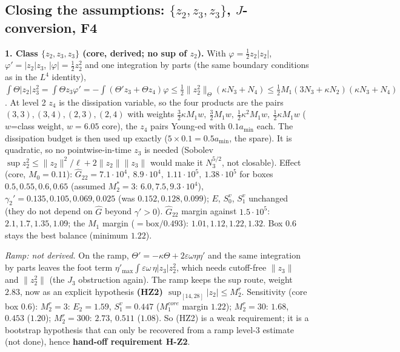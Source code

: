 \documentclass[11pt]{article}
\begin{document}
\subsection*{Closing the assumptions: $\{z_2,z_3,z_3\}$, $J$-conversion, F4}
\textbf{1. Class $\{z_2,z_3,z_3\}$ (core, derived; no sup of $z_2$).} With $\varphi=\tfrac12z_2|z_2|$, $\varphi'=|z_2|z_3$, $|\varphi|=\tfrac12z_2^2$ and one integration by parts (the same boundary conditions as in the $L^4$ identity),
$\int\Theta|z_2|z_3^2=\int\Theta z_3\varphi'=-\int(\Theta'z_3+\Theta z_4)\varphi\le\tfrac12\|z_2^2\|_\Theta(\kappa N_3+N_4)\le\tfrac12M_1(3N_3+\kappa N_2)(\kappa N_3+N_4)$.
At level 2 $z_4$ is the dissipation variable, so the four products are the pairs $(3,3),(3,4),(2,3),(2,4)$ with weights $\tfrac32\kappa M_1w,\ \tfrac32M_1w,\ \tfrac12\kappa^2M_1w,\ \tfrac12\kappa M_1w$ ($w$=class weight, $w=6.05$ core), the $z_4$ pairs Young-ed with $0.1a_{\min}$ each. The dissipation budget is then used up exactly ($5\times0.1=0.5a_{\min}$, the spare). It is quadratic, so no pointwise-in-time $z_3$ is needed (Sobolev $\sup z_2^2\le\|z_2\|^2/\ell+2\|z_2\|\|z_3\|$ would make it $N_3^{5/2}$, not closable). Effect (core, $M_0=0.11$): $\hat G_{22}=7.1\cdot10^4,\ 8.9\cdot10^4,\ 1.11\cdot10^5,\ 1.38\cdot10^5$ for boxes $0.5,0.55,0.6,0.65$ (assumed $M_2^*=3$: $6.0,7.5,9.3\cdot10^4$), $\gamma_2'=0.135,0.105,0.069,0.025$ (was $0.152,0.128,0.099$); $E$, $S_0^v$, $S_1^v$ unchanged (they do not depend on $\hat G$ beyond $\gamma'>0$). $\hat G_{22}$ margin against $1.5\cdot10^5$: $2.1,1.7,\mathbf{1.35},1.09$; the $M_1$ margin ($=\text{box}/0.493$): $1.01,1.12,\mathbf{1.22},1.32$. Box $0.6$ stays the best balance (minimum $1.22$).

\emph{Ramp: not derived.} On the ramp, $\Theta'=-\kappa\Theta+2\varepsilon\omega\eta\eta'$ and the same integration by parts leaves the foot term $\eta'_{\max}\int\varepsilon\omega\,\eta|z_3|z_2^2$, which needs cutoff-free $\|z_3\|$ and $\|z_2^2\|$ (the $J_3$ obstruction again). The ramp keeps the sup route, weight $2.83$, now as an explicit hypothesis \textbf{(HZ2) $\sup_{[14,28]}|z_2|\le M_2^r$}. Sensitivity (core box $0.6$): $M_2^r=3$: $E_2=1.59$, $S_1^v=0.447$ ($M_1^{core}$ margin $1.22$); $M_2^r=30$: $1.68$, $0.453$ ($1.20$); $M_2^r=300$: $2.73$, $0.511$ ($1.08$). So (HZ2) is a weak requirement; it is a bootstrap hypothesis that can only be recovered from a ramp level-3 estimate (not done), hence \textbf{hand-off requirement H-Z2}.
\end{document}
